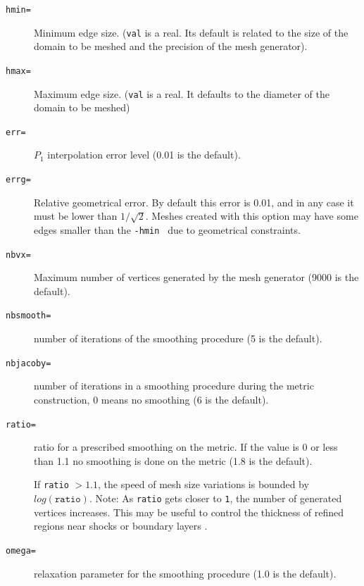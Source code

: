 \documentclass[a4paper,twoside,12pt]{book}
\begin{document}
\begin{description}

\item[\texttt{hmin=}] Minimum edge size.   ({\tt val} is a real. Its default is related to the
size of the domain to be meshed and the precision of the mesh generator).

\item[\texttt{hmax=}] Maximum edge size.  ({\tt val} is a real.  It defaults to the diameter of the domain to be meshed)

\item[\texttt{err=}] $P_1$ interpolation error level (0.01 is the default).  

\item[\texttt{errg=}] Relative geometrical error. By default this error is 0.01, and in any case it must be lower than
$1/\sqrt{2}$.  Meshes created with this option may have some edges smaller than the {\tt -hmin } due to geometrical
constraints.  

\item[\texttt{nbvx=}] Maximum number of vertices generated by the mesh generator (9000 is the default).

\item[\texttt{nbsmooth=}] number of iterations of the smoothing procedure (5 is the default).

\item[\texttt{nbjacoby=}] number of iterations in a smoothing procedure during the metric construction, 0 means no
smoothing (6 is the default).  

\item[\texttt{ratio=}] ratio for a prescribed smoothing on the metric.  If the value is 0 or less than 1.1 no smoothing
is done on the metric (1.8 is the default).

If \texttt{ratio} $> 1.1$, the speed of mesh size variations is bounded by $log(\mathtt{ratio})$.  Note: As {\tt ratio}
gets closer to {\tt 1}, the number of generated vertices increases.  This may be useful to control the thickness of
refined regions near shocks or boundary layers .  

\item[\texttt{omega=}] relaxation parameter for the smoothing procedure (1.0 is the default).  


\end{description}
\end{document}
